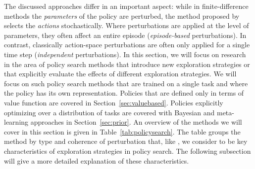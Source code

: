 The discussed approaches differ in an important aspect: while in finite-difference methods  the \emph{parameters} of the policy are perturbed, the method proposed by  selects the \emph{actions} stochastically. Where perturbations are applied at the level of parameters, they often affect an entire episode (\emph{episode-based} perturbations). In contrast, classically action-space perturbations are often only applied for a single time step (\emph{independent} perturbations). 
In this section, we will focus on research in the area of policy search methods that  introduce new exploration strategies or that explicitly evaluate the effects of different exploration strategies. 
We will focus on such policy search methods that are trained on a single task and where the policy has its own representation. Policies that are defined only in terms of value function are covered in Section~\ref{sec:valuebased}. Policies explicitly optimizing over a distribution of tasks are covered with Bayesian and meta-learning approaches in Section~\ref{sec:prior}. An overview of the methods we will cover in this section is given in Table~\ref{tab:policysearch}. The table groups the method by type and coherence of perturbation that, like , we consider to be key characteristics of exploration strategies in policy search. The following subsection will give a more detailed explanation of these characteristics.
